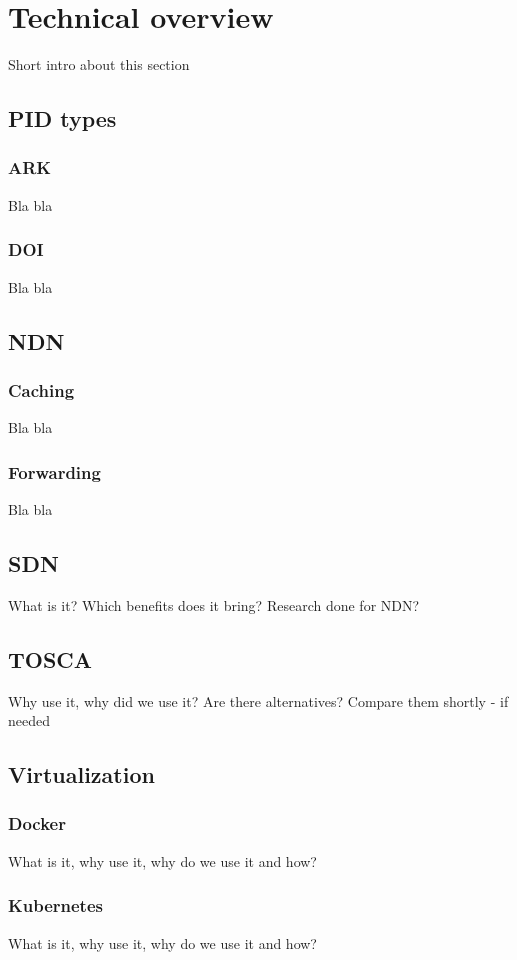 \section{Technical overview}
Short intro about this section

\subsection{PID types}
\subsubsection{ARK}
Bla bla

\subsubsection{DOI}
Bla bla

\subsection{NDN}
\subsubsection{Caching}
Bla bla

\subsubsection{Forwarding}
Bla bla

\subsection{SDN}
What is it? Which benefits does it bring? Research done for NDN?

\subsection{TOSCA}
Why use it, why did we use it? Are there alternatives? Compare them shortly - if needed

\subsection{Virtualization}
\subsubsection{Docker}
What is it, why use it, why do we use it and how?

\subsubsection{Kubernetes}
What is it, why use it, why do we use it and how?